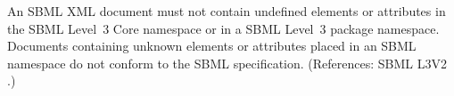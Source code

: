 An SBML XML document must not contain undefined elements or attributes in
the SBML Level~3 Core namespace or in a SBML Level~3 package namespace.
Documents containing unknown elements or attributes placed in an SBML
namespace do not conform to the SBML specification.  (References: SBML L3V2
.)
